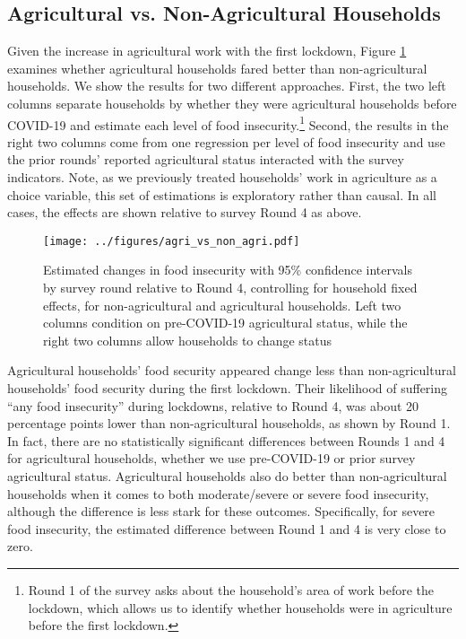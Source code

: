 \documentclass{wber}
\begin{document}
\subsection{Agricultural vs. Non-Agricultural Households}\label{agricultural-vs.-non-agricultural-households}

Given the increase in agricultural work with the first lockdown,
Figure \ref{fig:ag_vs_non_ag} examines whether agricultural households
fared better than non-agricultural households. We show the results for
two different approaches. First, the two left columns separate
households by whether they were agricultural households before COVID-19
and estimate each level of food insecurity.\footnote{Round 1 of the
  survey asks about the household's area of work before the lockdown,
  which allows us to identify whether households were in agriculture
  before the first lockdown.} Second, the results in the right two
columns come from one regression per level of food insecurity and use
the prior rounds' reported agricultural status interacted with the
survey indicators. Note, as we previously treated households' work in
agriculture as a choice variable, this set of estimations is exploratory
rather than causal. In all cases, the effects are shown relative to
survey Round 4 as above.

\begin{figure}
\centering
\texttt{[image: ../figures/agri\_vs\_non\_agri.pdf]}
\caption{Estimated changes in food insecurity with 95\% confidence
intervals by survey round relative to Round 4, controlling for household
fixed effects, for non-agricultural and agricultural households. Left
two columns condition on pre-COVID-19 agricultural status, while the
right two columns allow households to change
status}\label{fig:ag_vs_non_ag}
\end{figure}

Agricultural households' food security appeared change less than
non-agricultural households' food security during the first lockdown.
Their likelihood of suffering ``any food insecurity'' during lockdowns,
relative to Round 4, was about 20 percentage points lower than
non-agricultural households, as shown by Round 1. In fact, there are no
statistically significant differences between Rounds 1 and 4 for
agricultural households, whether we use pre-COVID-19 or prior survey
agricultural status. Agricultural households also do better than
non-agricultural households when it comes to both moderate/severe or
severe food insecurity, although the difference is less stark for these
outcomes. Specifically, for severe food insecurity, the estimated
difference between Round 1 and 4 is very close to zero.
\end{document}
